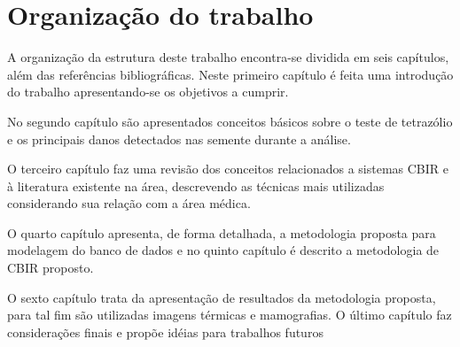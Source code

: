 \section{Organização do trabalho}


A organização da estrutura deste trabalho encontra-se dividida em seis capítulos, além das referências bibliográficas. Neste primeiro capítulo é feita uma introdução do trabalho apresentando-se os objetivos a cumprir. 


No segundo capítulo são apresentados conceitos básicos sobre o teste de tetrazólio e os principais danos detectados nas semente durante a análise.

O terceiro capítulo faz uma revisão dos conceitos relacionados a sistemas CBIR e à literatura existente na área, descrevendo as técnicas mais utilizadas considerando sua relação com a área médica. 

O quarto capítulo apresenta, de forma detalhada, a metodologia proposta para modelagem do banco de dados e no quinto capítulo é descrito a metodologia de CBIR proposto. 

O sexto capítulo trata da apresentação de resultados da metodologia proposta, para tal fim são utilizadas imagens térmicas e mamografias. 
O último capítulo faz considerações finais e propõe idéias para trabalhos futuros